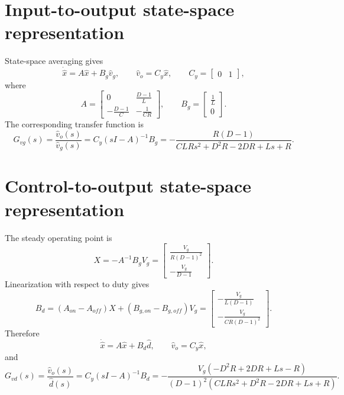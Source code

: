 \documentclass[11pt]{article}
\begin{document}
\section*{Input-to-output state-space representation}
State-space averaging gives
\begin{equation}
\dot{\hat x}=A\hat x+B_g\hat v_g,\qquad
\hat v_o=C_y\hat x,\qquad C_y=\begin{bmatrix}0&1\end{bmatrix},
\end{equation}
where
\begin{equation}
A=\left[\begin{matrix}0 & \frac{D - 1}{L}\\- \frac{D - 1}{C} & - \frac{1}{C R}\end{matrix}\right],\qquad B_g=\left[\begin{matrix}\frac{1}{L}\\0\end{matrix}\right].
\end{equation}
The corresponding transfer function is
\begin{equation}
G_{vg}(s)=\frac{\hat v_o(s)}{\hat v_g(s)}
=C_y(sI-A)^{-1}B_g=- \frac{R \left(D - 1\right)}{C L R s^{2} + D^{2} R - 2 D R + L s + R}.
\end{equation}

\section*{Control-to-output state-space representation}
The steady operating point is
\begin{equation}
X=-A^{-1}B_gV_g=\left[\begin{matrix}\frac{V_{g}}{R \left(D - 1\right)^{2}}\\- \frac{V_{g}}{D - 1}\end{matrix}\right].
\end{equation}
Linearization with respect to duty gives
\begin{equation}
B_d=(A_{on}-A_{off})X+(B_{g,on}-B_{g,off})V_g
=\left[\begin{matrix}- \frac{V_{g}}{L \left(D - 1\right)}\\- \frac{V_{g}}{C R \left(D - 1\right)^{2}}\end{matrix}\right].
\end{equation}
Therefore
\begin{equation}
\dot{\hat x}=A\hat x+B_d\hat d,\qquad
\hat v_o=C_y\hat x,
\end{equation}
and
\begin{equation}
G_{vd}(s)=\frac{\hat v_o(s)}{\hat d(s)}
=C_y(sI-A)^{-1}B_d=- \frac{V_{g} \left(- D^{2} R + 2 D R + L s - R\right)}{\left(D - 1\right)^{2} \left(C L R s^{2} + D^{2} R - 2 D R + L s + R\right)}.
\end{equation}
\end{document}
